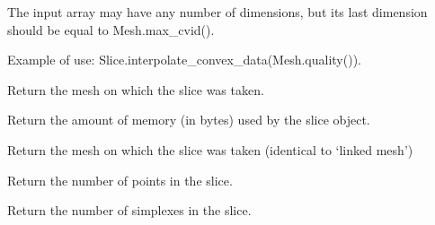 \documentclass[a4paper,11pt,english]{sphinxmanual}
\begin{document}
\begin{fulllineitems}
\begin{fulllineitems}
The input array  may have any number of dimensions, but its
last dimension should be equal to Mesh.max\_cvid().

Example of use: Slice.interpolate\_convex\_data(Mesh.quality()).

\end{fulllineitems}


\begin{fulllineitems}
\label{\detokenize{python/cmdref_Slice:getfem.Slice.linked_mesh}}
Return the mesh on which the slice was taken.

\end{fulllineitems}


\begin{fulllineitems}
\label{\detokenize{python/cmdref_Slice:getfem.Slice.memsize}}
Return the amount of memory (in bytes) used by the slice object.

\end{fulllineitems}


\begin{fulllineitems}
\label{\detokenize{python/cmdref_Slice:getfem.Slice.mesh}}
Return the mesh on which the slice was taken
(identical to ‘linked mesh’)

\end{fulllineitems}


\begin{fulllineitems}
\label{\detokenize{python/cmdref_Slice:getfem.Slice.nbpts}}
Return the number of points in the slice.

\end{fulllineitems}


\begin{fulllineitems}
\label{\detokenize{python/cmdref_Slice:getfem.Slice.nbsplxs}}
Return the number of simplexes in the slice.


\end{fulllineitems}
\end{fulllineitems}
\end{document}
